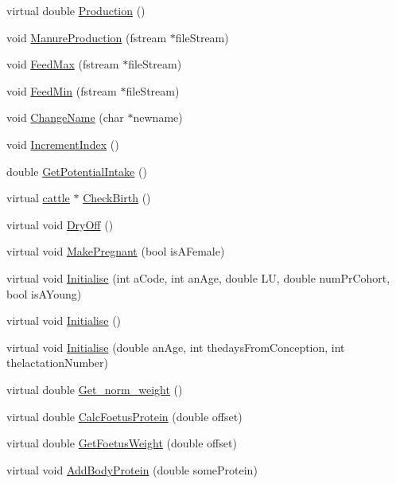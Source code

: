 \begin{DoxyCompactItemize}
\item 
virtual double \hyperlink{classcattle_a6baa384415f687dbe7fa420cb46bb62e}{Production} ()
\item 
void \hyperlink{classcattle_abbfa3e590fcb00ff39222a765f8cf608}{ManureProduction} (fstream $\ast$fileStream)
\item 
void \hyperlink{classcattle_a65484ea0fdd7d59d96108c6ecc50e323}{FeedMax} (fstream $\ast$fileStream)
\item 
void \hyperlink{classcattle_a9aff531955828de8e998e2e44ba6f935}{FeedMin} (fstream $\ast$fileStream)
\item 
void \hyperlink{classcattle_a79f811501b724b91335646e7c7452602}{ChangeName} (char $\ast$newname)
\item 
void \hyperlink{classcattle_ae68f10b2d5e32d120b4d90b5922534cf}{IncrementIndex} ()
\item 
double \hyperlink{classcattle_a2aefe7556df04aa4cff0e773d6c50db4}{GetPotentialIntake} ()
\item 
virtual \hyperlink{classcattle}{cattle} $\ast$ \hyperlink{classcattle_a0f0686111d6eb6ba5dec8b3b92cecb76}{CheckBirth} ()
\item 
virtual void \hyperlink{classcattle_a4c5d739e38ea76e5615b53e5f588d771}{DryOff} ()
\item 
virtual void \hyperlink{classcattle_adec0490651ec7d3cfb5b90250dd42dc0}{MakePregnant} (bool isAFemale)
\item 
virtual void \hyperlink{classcattle_ab606ffff933142bc469c151721050d2d}{Initialise} (int aCode, int anAge, double LU, double numPrCohort, bool isAYoung)
\item 
virtual void \hyperlink{classcattle_a7a2111adbacdb6ec477005ac5779077b}{Initialise} ()
\item 
virtual void \hyperlink{classcattle_a1ff860afd88aa3c58c66a5291ccbacb5}{Initialise} (double anAge, int thedaysFromConception, int thelactationNumber)
\item 
virtual double \hyperlink{classcattle_a5b3d8710accc9b14ac6881ed758fe4ae}{Get\_\-norm\_\-weight} ()
\item 
virtual double \hyperlink{classcattle_a8643521d1530588eeff5d92013063038}{CalcFoetusProtein} (double offset)
\item 
virtual double \hyperlink{classcattle_a46b5f1e591b420acb2e2ce0e69aef5fe}{GetFoetusWeight} (double offset)
\item 
virtual void \hyperlink{classcattle_af266fc5caa824f4449d443228c39bd9c}{AddBodyProtein} (double someProtein)
\item 

\end{DoxyCompactItemize}

